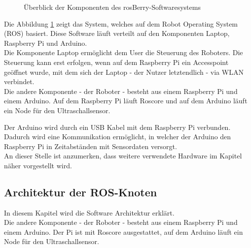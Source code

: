 \documentclass[conference]{IEEEtran}
\begin{document}
	\begin{figure}[!ht]
		\centering
		\def\svgwidth{9cm}
		
		\caption{Überblick der Komponenten des rosBerry-Softwaresystems}
		\label{Gesamtzusammenhang}
	\end{figure}
	Die Abbildung \ref{Gesamtzusammenhang} zeigt das System, welches auf 
	dem Robot Operating System (ROS) basiert.
	Diese Software läuft verteilt auf den Komponenten Laptop, Raspberry Pi und Arduino.
	\\
	Die Komponente Laptop ermöglicht dem User die Steuerung des 
	Roboters.
	Die Steuerung kann erst erfolgen, wenn auf dem Raspberry Pi ein Accesspoint geöffnet wurde, mit dem sich der Laptop - der Nutzer letztendlich - via WLAN verbindet.
	\\
	Die andere Komponente - der Roboter - besteht aus einem Raspberry Pi und einem Arduino.
	Auf dem Raspberry Pi läuft Roscore und auf dem Arduino läuft ein Node für den Ultraschallsensor.
	
	Der Arduino wird durch ein USB Kabel mit dem Raspberry Pi verbunden.
	Dadurch wird eine Kommunikation ermöglicht, in welcher der Arduino den Raspberry Pi in Zeitabständen mit Sensordaten versorgt.
	\\
	An dieser Stelle ist anzumerken, dass weitere verwendete Hardware im Kapitel  näher vorgestellt wird.
	
	\subsection{Architektur der ROS-Knoten}\label{sec:Architektur}
	
	In diesem Kapitel wird die Software Architektur erklärt.
	\\
	Die andere Komponente - der Roboter - besteht aus einem Raspberry Pi 
	und einem Arduino.
	Der Pi ist mit Roscore ausgestattet, auf dem Arduino läuft ein Node für 
	den Ultraschallsensor.
	
\end{document}
